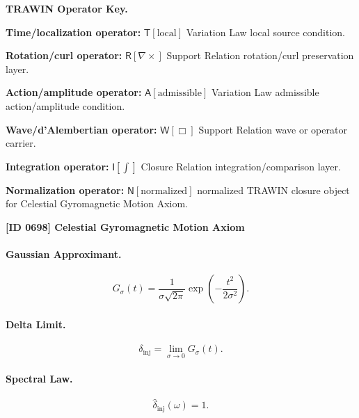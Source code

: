 \par\vspace{0.45\baselineskip}
\noindent\begin{minipage}[t]{\linewidth}
\begingroup
\small
\raggedright
\textbf{TRAWIN Operator Key.}\par
\noindent\textbf{Time/localization operator:} $\mathsf{T}\!\left[\mathrm{local}\right]$ Variation Law local source condition.\par
\noindent\textbf{Rotation/curl operator:} $\mathsf{R}\!\left[\nabla\times\right]$ Support Relation rotation/curl preservation layer.\par
\noindent\textbf{Action/amplitude operator:} $\mathsf{A}\!\left[\mathrm{admissible}\right]$ Variation Law admissible action/amplitude condition.\par
\noindent\textbf{Wave/d'Alembertian operator:} $\mathsf{W}\!\left[\Box\right]$ Support Relation wave or operator carrier.\par
\noindent\textbf{Integration operator:} $\mathsf{I}\!\left[\int\right]$ Closure Relation integration/comparison layer.\par
\noindent\textbf{Normalization operator:} $\mathsf{N}\!\left[\mathrm{normalized}\right]$ normalized TRAWIN closure object for Celestial Gyromagnetic Motion Axiom.\par
\endgroup
\end{minipage}

\clearpage
\noindent\textbf{[ID 0698] Celestial Gyromagnetic Motion Axiom}\par
\vspace{0.35em}
\paragraph{Gaussian Approximant.}
\begin{equation}
G_{\sigma}(t)
=
\frac{1}{\sigma\sqrt{2\pi}}
\exp\left(
-\frac{t^2}{2\sigma^2}
\right).
\end{equation}

\paragraph{Delta Limit.}
\begin{equation}
\delta_{\mathrm{inj}}
=
\lim_{\sigma\to0}G_{\sigma}(t).
\end{equation}

\paragraph{Spectral Law.}
\begin{equation}
\widehat{\delta}_{\mathrm{inj}}(\omega)=1.
\end{equation}

